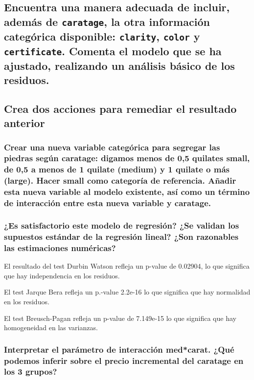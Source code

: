 \documentclass[a4paper, 9pt]{article}
\begin{document}
\subsection{Encuentra una manera adecuada de incluir, además de \texttt{caratage}, la otra información categórica disponible: \texttt{clarity}, \texttt{color} y \texttt{certificate}. Comenta el modelo que se ha ajustado, realizando un análisis básico de los residuos.}
\label{subsec:question-2}


\subsection{Crea dos acciones para remediar el resultado anterior}
\label{subsec:question-3}

\subsubsection{Crear una nueva variable categórica para segregar las piedras según caratage: digamos menos de 0,5 quilates small, de 0,5 a menos de 1 quilate (medium) y 1 quilate o más (large). Hacer small como categoría de referencia. Añadir esta nueva variable al modelo existente, así como un término de interacción entre esta nueva variable y caratage.}


\subsubsection{¿Es satisfactorio este modelo de regresión? ¿Se validan los supuestos estándar de la regresión lineal? ¿Son razonables las estimaciones numéricas?}

El resultado del test Durbin Watson refleja un p-value de 0.02904, lo que significa que hay independencia en los residuos.

El test Jarque Bera refleja un p.-value 2.2e-16 lo que significa que hay normalidad en los residuos.

El test Breusch-Pagan refleja un p-value de 7.149e-15 lo que significa que hay homogeneidad en las varianzas.

\subsubsection{Interpretar el parámetro de interacción med*carat. ¿Qué podemos inferir sobre el precio incremental del caratage en los 3 grupos?}
\end{document}
